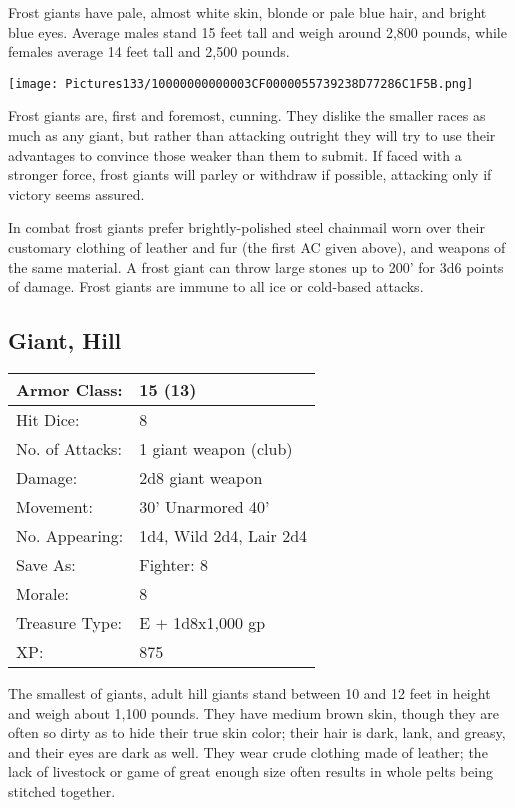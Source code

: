 \documentclass[a4paper,twoside,openany,10pt]{book}
\begin{document}
\begin{multicols}{2}
Frost giants have pale, almost white skin, blonde or pale blue hair, and bright blue eyes. Average males stand 15 feet tall and weigh around 2,800 pounds, while females average 14 feet tall and 2,500 pounds.


\begin{center}
	\texttt{[image: Pictures133/10000000000003CF0000055739238D77286C1F5B.png]}
\end{center}

Frost giants are, first and foremost, cunning. They dislike the smaller races as much as any giant, but rather than attacking outright they will try to use their advantages to convince those weaker than them to submit. If faced with a stronger force, frost giants will parley or withdraw if possible, attacking only if victory seems assured.

In combat frost giants prefer brightly-polished steel chainmail worn over their customary clothing of leather and fur (the first AC given above), and weapons of the same material. A frost giant can throw large stones up to 200' for 3d6 points of damage. Frost giants are immune to all ice or cold-based attacks.


\subsection*{Giant, Hill}\label{giant-hill}

\begin{tabularx}{0.48\textwidth}{@{}lX@{}}
Armor Class: & 15 (13) \\\hline
Hit Dice: & 8 \\\hline
No. of Attacks: & 1 giant weapon (club) \\\hline
Damage: & 2d8 giant weapon \\\hline
Movement: & 30' Unarmored 40' \\\hline
No. Appearing: & 1d4, Wild 2d4, Lair 2d4 \\\hline
Save As: & Fighter: 8 \\\hline
Morale: & 8 \\\hline
Treasure Type: & E + 1d8x1,000 gp \\\hline
XP: & 875 \\\hline
\end{tabularx}\medskip

The
smallest of giants, adult hill giants stand between 10 and 12 feet in height and weigh about 1,100 pounds. They have medium brown skin, though they are often so dirty as to hide their true skin color; their hair is dark, lank, and greasy, and their eyes are dark as well. They wear crude clothing made of leather; the lack of livestock or game of great enough size often results in whole pelts being stitched together.


\end{multicols}
\end{document}
